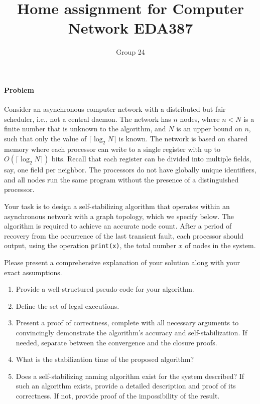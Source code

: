 \documentclass[12pt]{article}
\title{Home assignment for Computer Network EDA387}
\author{Group 24}
\begin{document}
\maketitle

\vspace{0.5in}

\paragraph{Problem}

Consider an asynchronous computer network with a distributed but fair scheduler, i.e.,
not a central daemon. The network has $n$ nodes, where $n < N$ is a finite number
that is unknown to the algorithm, and $N$ is an upper bound on $n$, such that only the value
of $\lceil \log_2 N \rceil$ is known. The network is based on shared memory where each processor
can write to a single register with up to $O(\lceil \log_2 N \rceil)$ bits. 
Recall that each register can be divided into multiple fields, say, one field per neighbor. 
The processors do not have globally unique identifiers, and all nodes run the same program 
without the presence of a distinguished processor.

Your task is to design a self-stabilizing algorithm that operates within an asynchronous
network with a graph topology, which we specify below. 
The algorithm is required to achieve an accurate node count. After a period of recovery 
from the occurrence of the last transient fault, each processor should output, using the 
operation \texttt{print(x)}, the total number $x$ of nodes in the system.

Please present a comprehensive explanation of your solution along with your exact assumptions.

\begin{enumerate}
    \item Provide a well-structured pseudo-code for your algorithm.
    \item Define the set of legal executions.
    \item Present a proof of correctness, complete with all necessary arguments to convincingly 
          demonstrate the algorithm’s accuracy and self-stabilization. If needed, separate 
          between the convergence and the closure proofs.
    \item What is the stabilization time of the proposed algorithm?
    \item Does a self-stabilizing naming algorithm exist for the system described? 
          If such an algorithm exists, provide a detailed description and proof of its correctness. 
          If not, provide proof of the impossibility of the result.
\end{enumerate}
\end{document}
